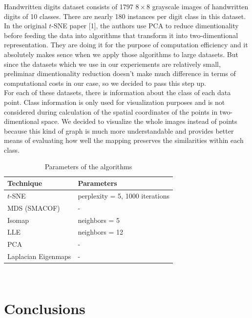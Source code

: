 Handwritten digits dataset consists of 1797 $8 \times 8$ grayscale images of handwritten digits of 10 classes. There are nearly 180 instances per digit class in this dataset.\\

In the original $t$-SNE paper [1], the authors use PCA to reduce dimentionality before feeding the data into algorithms that transform it into two-dimentional representation. They are doing it for the purpose of computation efficiency and it absolutely makes sence when we apply those algorithms to large datasets. But since the datasets which we use in our experiements are relatively small, preliminar dimentionality reduction doesn't make much difference in terms of computational costs in our case, so we decided to pass this step up.\\

For each of these datasets, there is information about the class of each data point. Class information is only used for visualization purposes and is not considered during calculation of the spatial coordinates of the points in two-dimentional space. We decided to visualize the whole images instead of points because this kind of graph is much more understandable and provides better means of evaluating how well the mapping preserves the similarities within each class.\\


\begin{table}
	\centering
	\begin{tabular}{| l | l |}
		\hline
		Technique & Parameters \\
		\hline			
		$t$-SNE & perplexity = 5, 1000 iterations    \\
		MDS (SMACOF) & -  \\
		Isomap & neighbors = 5  \\
		LLE & neighbors = 12 \\
		PCA & - \\
		Laplacian Eigenmaps & - \\
		\hline  
	\end{tabular}\\
	\caption{Parameters of the algorithms}
\end{table}







\section{Conclusions}



